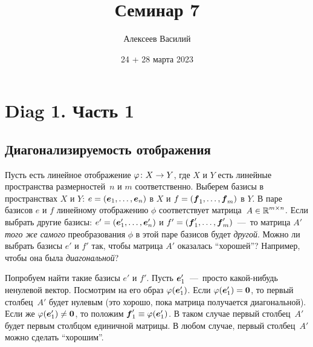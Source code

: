 \documentclass[a4paper,12pt]{article}
\author{Алексеев Василий}
\title{Семинар 7}
\date{24 + 28 марта 2023}
\begin{document}
  \maketitle
  
  \tableofcontents

  \thispagestyle{empty}
  
  \newpage
  


  \section{Diag 1. Часть 1}
  
  \subsection{Диагонализируемость отображения}
  
  Пусть есть линейное отображение $\phi\colon X \hm\to Y$, где $X$ и $Y$ есть линейные пространства размерностей~$n$ и $m$ соответственно.
  Выберем базисы в пространствах $X$ и $Y$: $e \hm= (\bds e_1, \ldots, \bds e_n)$ в $X$ и $f \hm= (\bds f_1, \ldots, \bds f_m)$ в $Y$.
  В паре базисов $e$ и $f$ линейному отображению $\phi$ соответствует матрица~$A \hm\in \RR^{m\times n}$.
  Если выбрать другие базисы: $e' = (\boldsymbol e_1', \ldots, \boldsymbol e_n')$ и $f' = (\boldsymbol f_1', \ldots, \boldsymbol f_m')$~---~то матрица $A'$ \emph{того же самого} преобразования $\phi$ в этой паре базисов будет \emph{другой}.
  Можно ли выбрать базисы $e'$ и $f'$ так, чтобы матрица $A'$ оказалась ``хорошей''?
  Например, чтобы она была \emph{диагональной}?
  
  Попробуем найти такие базисы $e'$ и $f'$.
  Пусть $\boldsymbol e_1'$~---~просто какой-нибудь ненулевой вектор.
  Посмотрим на его образ $\varphi(\boldsymbol e_1')$.
  Если $\phi(\bds e_1') \hm= \bds 0$, то первый столбец~$A'$ будет нулевым (это хорошо, пока матрица получается диагональной).
  Если же $\phi(\bds e_1') \hm{\not=} \bds 0$, то положим $\bds f_1' \hm\equiv \phi(\bds e_1')$.
  В таком случае первый столбец~$A'$ будет первым столбцом единичной матрицы.
  В любом случае, первый столбец~$A'$ можно сделать ``хорошим''.
  
\end{document}
